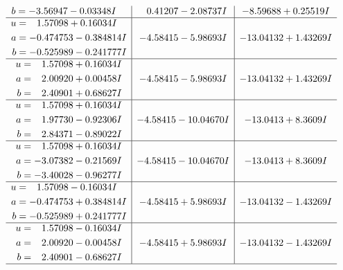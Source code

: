 \documentclass[1p]{elsarticle_modified}
\theoremstyle{definition}
\begin{document}
$$\begin{array}{c|c|c}
\begin{aligned}
b &= -3.56947 - 0.03348 I\end{aligned}
 & \phantom{-}0.41207 - 2.08737 I & -8.59688 + 0.25519 I \\ \hline\begin{aligned}
u &= \phantom{-}1.57098 + 0.16034 I \\
a &= -0.474753 - 0.384814 I \\
b &= -0.525989 - 0.241777 I\end{aligned}
 & -4.58415 - 5.98693 I & -13.04132 + 1.43269 I \\ \hline\begin{aligned}
u &= \phantom{-}1.57098 + 0.16034 I \\
a &= \phantom{-}2.00920 + 0.00458 I \\
b &= \phantom{-}2.40901 + 0.68627 I\end{aligned}
 & -4.58415 - 5.98693 I & -13.04132 + 1.43269 I \\ \hline\begin{aligned}
u &= \phantom{-}1.57098 + 0.16034 I \\
a &= \phantom{-}1.97730 - 0.92306 I \\
b &= \phantom{-}2.84371 - 0.89022 I\end{aligned}
 & -4.58415 - 10.04670 I & -13.0413 + 8.3609 I \\ \hline\begin{aligned}
u &= \phantom{-}1.57098 + 0.16034 I \\
a &= -3.07382 - 0.21569 I \\
b &= -3.40028 - 0.96277 I\end{aligned}
 & -4.58415 - 10.04670 I & -13.0413 + 8.3609 I \\ \hline\begin{aligned}
u &= \phantom{-}1.57098 - 0.16034 I \\
a &= -0.474753 + 0.384814 I \\
b &= -0.525989 + 0.241777 I\end{aligned}
 & -4.58415 + 5.98693 I & -13.04132 - 1.43269 I \\ \hline\begin{aligned}
u &= \phantom{-}1.57098 - 0.16034 I \\
a &= \phantom{-}2.00920 - 0.00458 I \\
b &= \phantom{-}2.40901 - 0.68627 I\end{aligned}
 & -4.58415 + 5.98693 I & -13.04132 - 1.43269 I\\
 \hline 
 \end{array}$$\newpage$$\begin{array}{c|c|c}  

\end{array}$$
\end{document}
